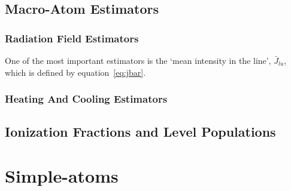 \subsection{Macro-Atom Estimators}


\subsubsection{Radiation Field Estimators}

One of the most important estimators is the `mean intensity in the line', $\bar{J}_{lu}$,
which is defined by equation~\ref{eq:jbar}. 


\subsubsection{Heating And Cooling Estimators}

\subsection{Ionization Fractions and Level Populations}




\section{Simple-atoms}


